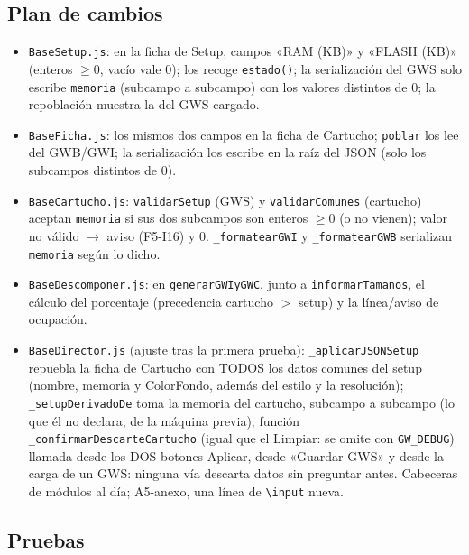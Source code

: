 \subsection{Plan de cambios}
\label{sec:F5I20Plan}

\begin{itemize}
	\item \texttt{BaseSetup.js}: en la ficha de Setup, campos
	«RAM (KB)»{} y «FLASH
	(KB)»{} (enteros $\ge 0$, vacío vale 0); los recoge
	\texttt{estado()}; la serialización del GWS solo escribe
	\texttt{memoria} (subcampo a subcampo) con los valores distintos de 0;
	la repoblación muestra la del GWS cargado.
	\item \texttt{BaseFicha.js}: los mismos dos campos en la ficha de
	Cartucho; \texttt{poblar} los lee del GWB/GWI; la serialización los
	escribe en la raíz del JSON (solo los subcampos distintos de 0).
	\item \texttt{BaseCartucho.js}: \texttt{validarSetup} (GWS) y
	\texttt{validarComunes} (cartucho) aceptan \texttt{memoria} si sus dos
	subcampos son enteros $\ge 0$ (o no vienen); valor no válido $\to$
	aviso (F5-I16) y 0. \texttt{\_formatearGWI} y \texttt{\_formatearGWB}
	serializan \texttt{memoria} según lo dicho.
	\item \texttt{BaseDescomponer.js}: en \texttt{generarGWIyGWC}, junto a
	\texttt{informarTamanos}, el cálculo del porcentaje (precedencia
	cartucho $>$ setup) y la línea/aviso de ocupación.
	\item \texttt{BaseDirector.js} (ajuste tras la primera prueba):
	\texttt{\_aplicarJSONSetup} repuebla la ficha de Cartucho con TODOS los
	datos comunes del setup (nombre, memoria y ColorFondo, además del
	estilo y la resolución); \texttt{\_setupDerivadoDe} toma la memoria
	del cartucho, subcampo a subcampo (lo que él no declara, de la
	máquina previa); función \texttt{\_confirmarDescarteCartucho}
	(igual que el Limpiar: se omite con \texttt{GW\_DEBUG}) llamada desde
	los DOS botones Aplicar, desde «Guardar GWS» y desde la carga de un
	GWS: ninguna vía descarta datos sin preguntar antes.
	Cabeceras de módulos al día; A5-anexo, una línea de
	\texttt{\textbackslash input} nueva.
\end{itemize}

\subsection{Pruebas}
\label{sec:F5I20Pruebas}

